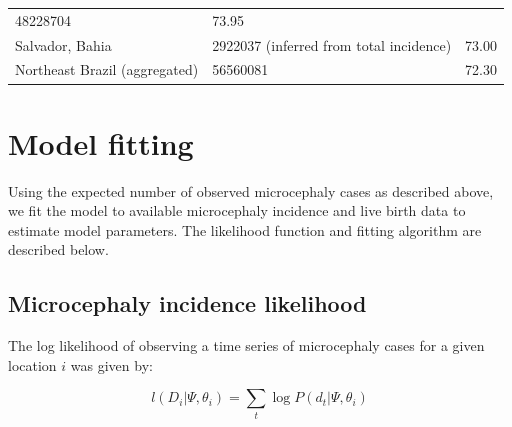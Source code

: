 \documentclass[10pt,letterpaper]{article}
\begin{document}
\begin{longtable}[]{@{}llr@{}}
\begin{minipage}[t]{0.29\columnwidth}
48228704\strut
\end{minipage} & \begin{minipage}[t]{0.45\columnwidth}\raggedleft\strut
73.95\strut
\end{minipage}\tabularnewline
\begin{minipage}[t]{0.17\columnwidth}\raggedright\strut
Salvador, Bahia\strut
\end{minipage} & \begin{minipage}[t]{0.29\columnwidth}\raggedright\strut
2922037 (inferred from total incidence)\strut
\end{minipage} & \begin{minipage}[t]{0.45\columnwidth}\raggedleft\strut
73.00\strut
\end{minipage}\tabularnewline
\begin{minipage}[t]{0.17\columnwidth}\raggedright\strut
Northeast Brazil (aggregated)\strut
\end{minipage} & \begin{minipage}[t]{0.29\columnwidth}\raggedright\strut
56560081\strut
\end{minipage} & \begin{minipage}[t]{0.45\columnwidth}\raggedleft\strut
72.30\strut
\end{minipage}\tabularnewline
\bottomrule
\end{longtable}

\normalsize

\section{Model fitting}\label{model-fitting}

Using the expected number of observed microcephaly cases as described
above, we fit the model to available microcephaly incidence and live
birth data to estimate model parameters. The likelihood function and
fitting algorithm are described below.

\subsection{Microcephaly incidence
likelihood}\label{microcephaly-incidence-likelihood}

The log likelihood of observing a time series of microcephaly cases for
a given location \(i\) was given by:

\begin{equation}
l(D_i|\Psi, \theta_i) = \sum_t \log P(d_t|\Psi, \theta_i)
\end{equation}
\end{document}
